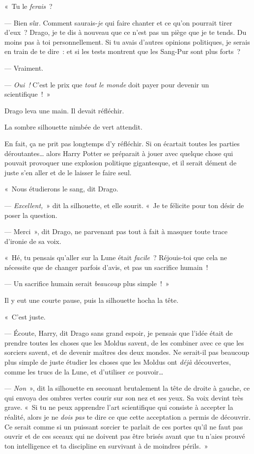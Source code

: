«~Tu le \emph{ferais}~?

--- Bien sûr. Comment saurais-\emph{je} qui faire chanter et ce qu'on pourrait tirer d'eux~? Drago, je te dis à nouveau que ce n'est pas un piège que je te tends. Du moins pas à toi personnellement. Si tu avais d'autres opinions politiques, je serais en train de te dire~: et si les tests montrent que les Sang-Pur sont plus forts~?

--- Vraiment.

--- \emph{Oui~!} C'est le prix que \emph{tout le monde} doit payer pour devenir un scientifique~!~»

Drago leva une main. Il devait réfléchir.

La sombre silhouette nimbée de vert attendit.

En fait, ça ne prit pas longtemps d'y réfléchir. Si on écartait toutes les parties déroutantes… alors Harry Potter se préparait à jouer avec quelque chose qui pouvait provoquer une explosion politique gigantesque, et il serait dément de juste s'en aller et de le laisser le faire seul.

«~Nous étudierons le sang, dit Drago.

--- \emph{Excellent,}~» dit la silhouette, et elle sourit. «~Je te félicite pour ton désir de poser la question.

--- Merci~», dit Drago, ne parvenant pas tout à fait à masquer toute trace d'ironie de sa voix.

«~Hé, tu pensais qu'aller sur la Lune était \emph{facile}~? Réjouis-toi que cela ne nécessite que de changer parfois d'avis, et pas un sacrifice humain~!

--- Un sacrifice humain serait \emph{beaucoup} plus simple~!~»

Il y eut une courte pause, puis la silhouette hocha la tête.

«~C'est juste.

--- Écoute, Harry, dit Drago sans grand espoir, je pensais que l'idée était de prendre toutes les choses que les Moldus savent, de les combiner avec ce que les sorciers savent, et de devenir maîtres des deux mondes. Ne serait-il pas beaucoup plus simple de juste étudier les choses que les Moldus ont \emph{déjà} découvertes, comme les trucs de la Lune, et d'utiliser \emph{ce} pouvoir…

--- \emph{Non}~», dit la silhouette en secouant brutalement la tête de droite à gauche, ce qui envoya des ombres vertes courir sur son nez et ses yeux. Sa voix devint très grave. «~Si tu ne peux apprendre l'art scientifique qui consiste à accepter la réalité, alors je ne \emph{dois pas} te dire ce que cette acceptation a permis de découvrir. Ce serait comme si un puissant sorcier te parlait de ces portes qu'il ne faut pas ouvrir et de ces sceaux qui ne doivent pas être brisés avant que tu n'aies prouvé ton intelligence et ta discipline en survivant à de moindres périls.~»

